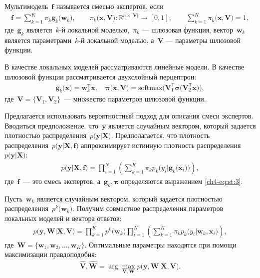 \begin{definition}
\label{def:2}
Мультимодель~$\mathbf{f}$ называется смесью экспертов, если
\[
\label{ch4-eq:st:2}
\begin{aligned}
\mathbf{f} = \sum_{k=1}^{K}\pi_{k}\mathbf{g}_k\bigr(\mathbf{w}_k\bigr), \qquad \pi_{k}\bigr(\mathbf{x}, \mathbf{V}\bigr):\mathbb{R}^{n\times \left|\mathbf{V}\right|} \to [0, 1], \qquad \sum_{k=1}^{K}\pi_{k}\bigr(\mathbf{x}, \mathbf{V}\bigr) = 1,
\end{aligned}
\]
где~$\mathbf{g}_k$ является~$k$-й локальной моделью,~$\pi_k$ --- шлюзовая функция, вектор~$\mathbf{w}_k$ является параметрами~$k$-й локальной моделью, а~$\mathbf{V}$ --- параметры шлюзовой функции.
\end{definition}

В качестве локальных моделей рассматриваются линейные модели. В качестве шлюзовой функции рассматривается двухслойный перцептрон:
\[
\label{ch4-eq:st:3}
\begin{aligned}
\mathbf{g}_k\bigr(\textbf{x}\bigr) = \textbf{w}_k^{\mathsf{T}}\textbf{x}, \quad
\bm{\pi}\bigr(\mathbf{x}, \mathbf{V}\bigr) = \text{softmax}\bigr(\mathbf{V}_{1}^{\mathsf{T}}\bm{\sigma}\bigr(\mathbf{V}_2^{\mathsf{T}}\mathbf{x}\bigr)\bigr),
\end{aligned}
\]
где~$\mathbf{V} = \bigr\{\mathbf{V}_1, \mathbf{V}_2\bigr\}$~--- множество параметров шлюзовой функции.

Предлагается использовать вероятностный подход для описания смеси экспертов. Вводиться предположение, что~$\textbf{y}$ является случайным вектором, который задается плотностью распределения~$p\bigr(\textbf{y}|\textbf{X}\bigr)$. Предполагается, что плотность распределения~$p\bigr(\textbf{y}|\textbf{X}, \textbf{f}\bigr)$ аппроксимирует истинную плотность распределения~$p\bigr(\textbf{y}|\textbf{X}\bigr)$:
\[
\label{ch4-eq:st:new:1}
\begin{aligned}
p\bigr(\textbf{y}|\textbf{X}, \textbf{f}\bigr) = \prod_{i=1}^{N}\left(\sum_{k=1}^{K}\pi_kp_{k}\bigr(y_{i}|\textbf{g}_{k}\bigr(\mathbf{x}_{i}\bigr)\bigr)\right),
\end{aligned}
\]
где~$\textbf{f}$~--- это смесь экспертов, а~$\textbf{g}_k, \bm{\pi}$ определяются выражением \eqref{ch4-eq:st:3}.

Пусть~$\textbf{w}_k$ является случайным вектором, который задается плотностью распределения~$p^{k}\bigr(\mathbf{w}_k\bigr)$. Получим совместное распределения параметров локальных моделей и вектора ответов:
\[
\label{ch4-eq:st:4}
\begin{aligned}
p\bigr(\mathbf{y}, \mathbf{W}|\mathbf{X}, \mathbf{V}\bigr) = \prod_{k=1}^{K}p^{k}\bigr(\mathbf{w}_k\bigr)\prod_{i=1}^{N}\left(\sum_{k=1}^{K}\pi_{k}p_{k}\bigr(y_i|\mathbf{w}_k, \mathbf{x}_i\bigr)\right),
\end{aligned}
\]
где~$\mathbf{W} = \bigr\{\mathbf{w}_1, \mathbf{w}_2, \ldots, \mathbf{w}_K\bigr\}.$
Оптимальные параметры находятся при помощи максимизации правдоподобия:
\[
\label{ch4-eq:st:5}
\begin{aligned}
\hat{\mathbf{V}}, \hat{ \mathbf{W}} = \arg\max_{\mathbf{V}, \mathbf{W}} p\bigr(\mathbf{y},  \mathbf{W}|\mathbf{X}, \mathbf{V}\bigr).
\end{aligned}
\]


